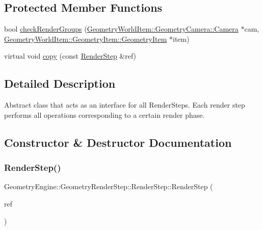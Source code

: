 \subsection*{Protected Member Functions}
\begin{DoxyCompactItemize}
\item 
bool \mbox{\hyperlink{class_geometry_engine_1_1_geometry_render_step_1_1_render_step_ad5895ae71a3b7ff4c0ec10cb07ea0195}{check\+Render\+Groups}} (\mbox{\hyperlink{class_geometry_engine_1_1_geometry_world_item_1_1_geometry_camera_1_1_camera}{Geometry\+World\+Item\+::\+Geometry\+Camera\+::\+Camera}} $\ast$cam, \mbox{\hyperlink{class_geometry_engine_1_1_geometry_world_item_1_1_geometry_item_1_1_geometry_item}{Geometry\+World\+Item\+::\+Geometry\+Item\+::\+Geometry\+Item}} $\ast$item)
\item 
virtual void \mbox{\hyperlink{class_geometry_engine_1_1_geometry_render_step_1_1_render_step_afe0321446beeb4093dba701424ec1e8c}{copy}} (const \mbox{\hyperlink{class_geometry_engine_1_1_geometry_render_step_1_1_render_step}{Render\+Step}} \&ref)
\end{DoxyCompactItemize}


\subsection{Detailed Description}
Abstract class that acts as an interface for all Render\+Steps. Each render step performs all operations corresponding to a certain render phase. 

\subsection{Constructor \& Destructor Documentation}
\mbox{\label{class_geometry_engine_1_1_geometry_render_step_1_1_render_step_a0a1c36303ca0342f1bf9afcecb35e513}} 
\subsubsection{\texorpdfstring{RenderStep()}{RenderStep()}}
{\footnotesize\ttfamily Geometry\+Engine\+::\+Geometry\+Render\+Step\+::\+Render\+Step\+::\+Render\+Step (\begin{DoxyParamCaption}\item[{const \mbox{\hyperlink{class_geometry_engine_1_1_geometry_render_step_1_1_render_step}{Render\+Step}} \&}]{ref }\end{DoxyParamCaption})\hspace{0.3cm}{\ttfamily [inline]}}

